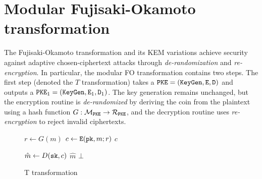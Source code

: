 \documentclass{article}
\begin{document}
\section{Modular Fujisaki-Okamoto transformation}
The Fujisaki-Okamoto transformation \cite{fujisaki1999secure} and its KEM variations \cite{hofheinz2017modular} achieve security against adaptive chosen-ciphertext attacks through \emph{de-randomization} and \emph{re-encryption}. In particular, the modular FO transformation contains two steps. The first step (denoted the $T$ transformation) takes a $\texttt{PKE} = (\texttt{KeyGen}, \texttt{E}, \texttt{D})$ and outputs a $\texttt{PKE}_1 = (\texttt{KeyGen}, \texttt{E}_1, \texttt{D}_1)$. The key generation remains unchanged, but the encryption routine is \emph{de-randomized} by deriving the coin from the plaintext using a hash function $G: \mathcal{M}_\texttt{PKE} \rightarrow \mathcal{R}_\texttt{PKE}$, and the decryption routine uses \emph{re-encryption} to reject invalid ciphertexts.

\begin{figure}[H]
    \begin{minipage}{0.49\textwidth}
        \begin{algorithm}[H]
            \caption{$\encrypt_1(\pk, m)$}\label{alg:encrypt-1}
            \begin{algorithmic}[1]
                \State $r \leftarrow G(m)$
                \State $c \leftarrow \texttt{E}(\texttt{pk}, m; r)$
                \State \Return $c$
            \end{algorithmic}
        \end{algorithm}
    \end{minipage}
    \hfill
    \begin{minipage}{0.49\textwidth}
        \begin{algorithm}[H]
            \caption{$\decrypt_1(\sk, c)$}\label{alg:decrypt-1}
            \begin{algorithmic}[1]
                \State $\hat{m} \leftarrow D(\texttt{sk}, c)$
                    \State \Return $\hat{m}$
                \EndIf
                \State \Return $\bot$
            \end{algorithmic}
        \end{algorithm}
    \end{minipage}

    \caption{T transformation}\label{fig:t-transformation}
\end{figure}
\end{document}
